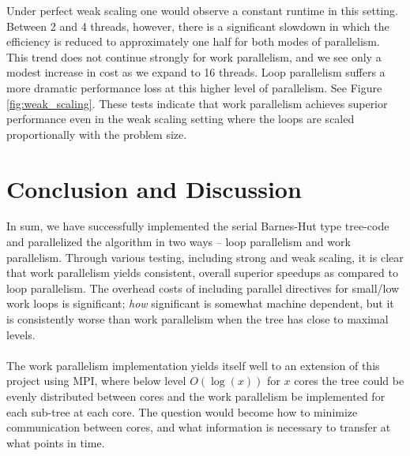 \documentclass{article}
\begin{document}
Under perfect weak scaling one would observe a constant runtime in this setting. Between 2 and 4 threads, however, there is a significant slowdown in which the efficiency is reduced to approximately one half for both modes of parallelism. This trend does not continue strongly for work parallelism, and we see only a modest increase in cost as we expand to 16 threads. Loop parallelism suffers a more dramatic performance loss at this higher level of parallelism. See Figure \ref{fig:weak_scaling}. These tests indicate that work parallelism achieves superior performance even in the weak scaling setting where the loops are scaled proportionally with the problem size.

\section{Conclusion and Discussion}
In sum, we have successfully implemented the serial Barnes-Hut type tree-code and parallelized the algorithm in two ways -- loop parallelism and work parallelism. Through various testing, including strong and weak scaling, it is clear that work parallelism yields consistent, overall superior speedups as compared to loop parallelism. The overhead costs of including parallel directives for small/low work loops is significant; \emph{how} significant is somewhat machine dependent, but it is consistently worse than work parallelism when the tree has close to maximal levels.\\\\
The work parallelism implementation yields itself well to an extension of this project using MPI, where below level $O(\log(x))$ for $x$ cores the tree could be evenly distributed between cores and the work parallelism be implemented for each sub-tree at each core. The question would become how to minimize communication between cores, and what information is necessary to transfer at what points in time.



\end{document}
